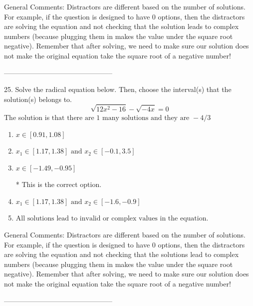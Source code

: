 \documentclass{article}[10pt]
\begin{document}
General Comments: Distractors are different based on the number of solutions. For example, if the question is designed to have 0 options, then the distractors are solving the equation and not checking that the solution leads to complex numbers (because plugging them in makes the value under the square root negative). Remember that after solving, we need to make sure our solution does not make the original equation take the square root of a negative number!

-----------------------------------------------

25. Solve the radical equation below. Then, choose the interval(s) that the solution(s) belongs to.
$$ \sqrt{12 x^2 - 16} - \sqrt{-4 x} = 0 $$ 
The solution is $ \text{that there are } 1 \text{ many solutions and they are } -4/3 $ 

\begin{enumerate}[label=\Alph*.] 
\item $ x \in [0.91,1.08] $ 

  
\item $ x_1 \in [1.17, 1.38] \text{ and } x_2 \in [-0.1,3.5] $ 

  
\item $ x \in [-1.49,-0.95] $ 

 * This is the correct option. 
\item $ x_1 \in [1.17, 1.38] \text{ and } x_2 \in [-1.6,-0.9] $ 

  
\item $ \text{All solutions lead to invalid or complex values in the equation.} $ 

  
\end{enumerate} 
 
General Comments: Distractors are different based on the number of solutions. For example, if the question is designed to have 0 options, then the distractors are solving the equation and not checking that the solutions lead to complex numbers (because plugging them in makes the value under the square root negative). Remember that after solving, we need to make sure our solution does not make the original equation take the square root of a negative number!

-----------------------------------------------
\end{document}
